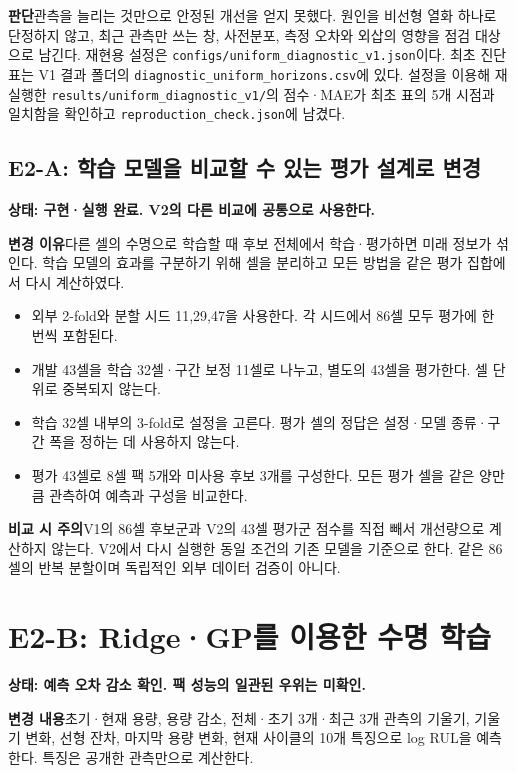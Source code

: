 \documentclass[11pt,a4paper]{article}
\newcommand{\file}[1]{{\small\nolinkurl{#1}}}
\newcommand{\state}[1]{\textbf{상태: #1}}
\begin{document}
\textbf{판단}\quad 관측을 늘리는 것만으로 안정된 개선을 얻지 못했다. 원인을 비선형 열화 하나로 단정하지 않고, 최근 관측만 쓰는 창, 사전분포, 측정 오차와 외삽의 영향을 점검 대상으로 남긴다. 재현용 설정은 \file{configs/uniform_diagnostic_v1.json}이다. 최초 진단표는 V1 결과 폴더의 \file{diagnostic_uniform_horizons.csv}에 있다. 설정을 이용해 재실행한 \file{results/uniform_diagnostic_v1/}의 점수·MAE가 최초 표의 5개 시점과 일치함을 확인하고 \file{reproduction_check.json}에 남겼다.

\subsection*{E2-A: 학습 모델을 비교할 수 있는 평가 설계로 변경}
\state{구현·실행 완료. V2의 다른 비교에 공통으로 사용한다.}

\textbf{변경 이유}\quad 다른 셀의 수명으로 학습할 때 후보 전체에서 학습·평가하면 미래 정보가 섞인다. 학습 모델의 효과를 구분하기 위해 셀을 분리하고 모든 방법을 같은 평가 집합에서 다시 계산하였다.
\begin{itemize}
\item 외부 2-fold와 분할 시드 11,29,47을 사용한다. 각 시드에서 86셀 모두 평가에 한 번씩 포함된다.
\item 개발 43셀을 학습 32셀·구간 보정 11셀로 나누고, 별도의 43셀을 평가한다. 셀 단위로 중복되지 않는다.
\item 학습 32셀 내부의 3-fold로 설정을 고른다. 평가 셀의 정답은 설정·모델 종류·구간 폭을 정하는 데 사용하지 않는다.
\item 평가 43셀로 8셀 팩 5개와 미사용 후보 3개를 구성한다. 모든 평가 셀을 같은 양만큼 관측하여 예측과 구성을 비교한다.
\end{itemize}

\textbf{비교 시 주의}\quad V1의 86셀 후보군과 V2의 43셀 평가군 점수를 직접 빼서 개선량으로 계산하지 않는다. V2에서 다시 실행한 동일 조건의 기존 모델을 기준으로 한다. 같은 86셀의 반복 분할이며 독립적인 외부 데이터 검증이 아니다.

\clearpage
\section{E2-B: Ridge·GP를 이용한 수명 학습}
\state{예측 오차 감소 확인. 팩 성능의 일관된 우위는 미확인.}

\textbf{변경 내용}\quad 초기·현재 용량, 용량 감소, 전체·초기 3개·최근 3개 관측의 기울기, 기울기 변화, 선형 잔차, 마지막 용량 변화, 현재 사이클의 10개 특징으로 log RUL을 예측한다. 특징은 공개한 관측만으로 계산한다.
\end{document}
